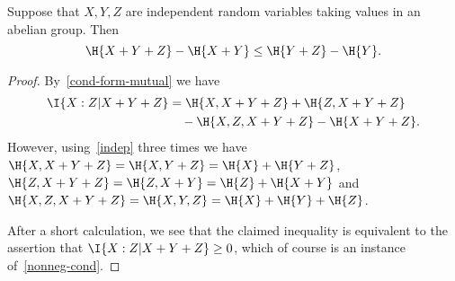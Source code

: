 \begin{lemma}
Suppose that $X, Y, Z$ are independent random variables taking values in an abelian group. Then
\[
  \H{X + Y + Z} - \H{X + Y} \leq \H{Y+Z} - \H{Y}.
\]
\end{lemma}

\begin{proof}
By~\eqref{cond-form-mutual} we have
\begin{align*}
\I{ X : Z | X+Y+Z} &= \H{X, X+Y+Z} + \H{Z, X+Y+Z} \\
&\quad - \H{X, Z, X+Y+Z} - \H{X+Y+Z}.
\end{align*}
However, using~\eqref{indep} three times we have $\H{X, X+Y+Z} = \H{X, Y+Z} = \H{X} + \H{Y+Z}$, $\H{Z, X+Y + Z} = \H{Z, X+Y} = \H{Z} + \H{X+Y}$ and $\H{X, Z, X+Y+Z} = \H{X, Y, Z} = \H{X} + \H{Y} + \H{Z}$.

After a short calculation, we see that the claimed inequality is equivalent to the assertion that $\I{ X : Z | X+Y+Z} \geq 0$, which of course is an instance of~\eqref{nonneg-cond}.
\end{proof}



